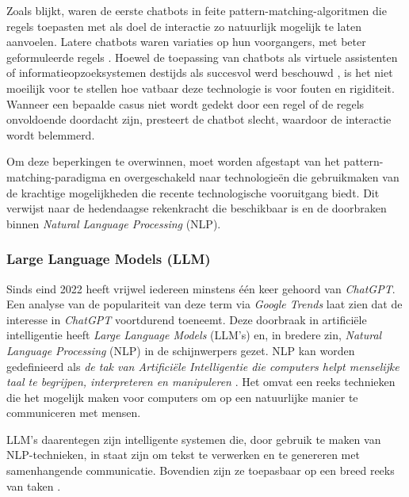Zoals blijkt, waren de eerste chatbots in feite pattern-matching-algoritmen die regels toepasten met als doel de interactie zo natuurlijk mogelijk te laten aanvoelen. Latere chatbots waren variaties op hun voorgangers, met beter geformuleerde regels \autocite{AbuShawar2007}. Hoewel de toepassing van chatbots als virtuele assistenten of informatieopzoeksystemen destijds als succesvol werd beschouwd \autocite{AbuShawar2007}, is het niet moeilijk voor te stellen hoe vatbaar deze technologie is voor fouten en rigiditeit. Wanneer een bepaalde casus niet wordt gedekt door een regel of de regels onvoldoende doordacht zijn, presteert de chatbot slecht, waardoor de interactie wordt belemmerd.

Om deze beperkingen te overwinnen, moet worden afgestapt van het pattern-matching-paradigma en overgeschakeld naar technologieën die gebruikmaken van de krachtige mogelijkheden die recente technologische vooruitgang biedt. Dit verwijst naar de hedendaagse rekenkracht die beschikbaar is en de doorbraken binnen \textit{Natural Language Processing} (NLP).

\subsubsection{Large Language Models (LLM)}

Sinds eind 2022 heeft vrijwel iedereen minstens één keer gehoord van \textit{ChatGPT}. Een analyse van de populariteit van deze term via \textit{Google Trends} laat zien dat de interesse in \textit{ChatGPT} voortdurend toeneemt. Deze doorbraak in artificiële intelligentie heeft \textit{Large Language Models} (LLM's) en, in bredere zin, \textit{Natural Language Processing} (NLP) in de schijnwerpers gezet. NLP kan worden gedefinieerd als \textit{de tak van Artificiële Intelligentie die computers helpt menselijke taal te begrijpen, interpreteren en manipuleren} \autocite{Zohuri2022}. Het omvat een reeks technieken die het mogelijk maken voor computers om op een natuurlijke manier te communiceren met mensen.

LLM's daarentegen zijn intelligente systemen die, door gebruik te maken van NLP-technieken, in staat zijn om tekst te verwerken en te genereren met samenhangende communicatie. Bovendien zijn ze toepasbaar op een breed reeks van taken \autocite{Naveed2023}.

